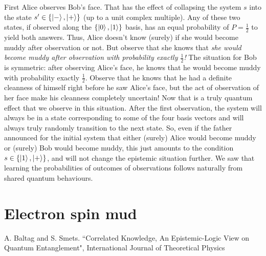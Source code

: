 \documentclass[a4paper]{article}
\begin{document}
First Alice observes Bob's face. That has the effect of collapsing the system
$s$ into the state $s' \in \{\ket{-}, \ket{+}\}$ (up to a unit complex
multiple). Any of these two states, if observed along the $\{\ket{0},\ket{1}\}$
basis, has an equal probability of $P = \frac{1}{2}$ to yield both answers.
Thus, Alice doesn't know (surely) if she would become muddy after observation or
not. But observe that she knows that \emph{she would become muddy after
observation with probability exactly $\frac{1}{2}$!} The situation for Bob is
symmetric: after observing Alice's face, he knows that he would become muddy
with probability exactly $\frac{1}{2}$. Observe that he knows that he had a
definite cleanness of himself right before he saw Alice's face, but the act of
observation of her face make his cleanness completely uncertain! Now that is a
truly quantum effect that we observe in this situation. After the first
observation, the system will always be in a state corresponding to some of the
four basis vectors and will always truly randomly transition to the next state.
So, even if the father announced for the initial system that either (surely)
Alice would become muddy or (surely) Bob would become muddy, this just amounts
to the condition $s \in \{\ket{1}, \ket{+}\}$, and will not change the epistemic
situation further. We saw that learning the probabilities of outcomes of
observations follows naturally from shared quantum behaviours.

\section*{Electron spin mud}

\begin{thebibliography}{9}
    A. Baltag and S. Smets. “Correlated Knowledge, An Epistemic-Logic View on Quantum Entanglement", International Journal of Theoretical Physics
\end{thebibliography}
\end{document}
